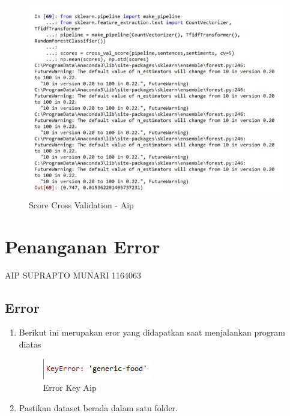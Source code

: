 \begin{figure}[ht]
\centering
\includegraphics[scale=0.3]{figures/AIP/e34.PNG}
\caption{Score Cross Validation - Aip}
\label{Score Cross Validation - Aip}
\end{figure}

\section{Penanganan Error}
AIP SUPRAPTO MUNARI 1164063
\subsection{Error}
\begin{enumerate}
	\item
Berikut ini merupakan eror yang didapatkan saat menjalankan program diatas
\begin{figure}[ht]
\centering
\includegraphics[scale=0.5]{figures/AIP/errorc1.PNG}
\caption{Error Key Aip }
\label{Error}
\end{figure}
\item
Pastikan dataset berada dalam satu folder.
\end{enumerate}









